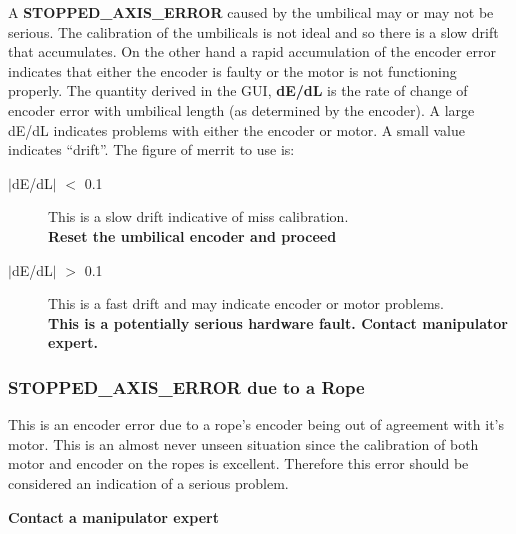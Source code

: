   A {\bf STOPPED\_AXIS\_ERROR} caused by the umbilical may or may not
be serious.  The calibration of the umbilicals is not ideal and so there
is a slow drift that accumulates.  On the other hand a rapid accumulation
of the encoder error indicates that either the encoder is  faulty or
the motor is not functioning properly.  The quantity derived in the 
GUI, {\bf dE/dL} is the rate of change of encoder error with umbilical
length (as determined by the encoder).  A large dE/dL indicates problems
with either the encoder or motor.  A small value indicates ``drift''.
The figure of merrit to use is:

\begin{description}
\item[ $|$dE/dL$|$ $<$ 0.1] This is a slow drift indicative of 
  miss calibration.\\
  {\bf Reset the umbilical encoder and proceed}
\item[ $|$dE/dL$|$ $>$ 0.1] This is a fast drift and may indicate
  encoder or motor problems.\\
  {\bf This is a potentially serious hardware fault.  Contact
  manipulator expert.}
\end{description}

  
\subsubsection{STOPPED\_AXIS\_ERROR due to a Rope}
  This is an encoder error due to a rope's encoder being out of 
agreement with it's motor.  This is an almost never unseen situation
since the calibration of both motor and encoder on the ropes is 
excellent.  Therefore this error should be considered an indication of
a serious problem.
  
\begin{center}
{\bf Contact a manipulator expert}
\end{center}

